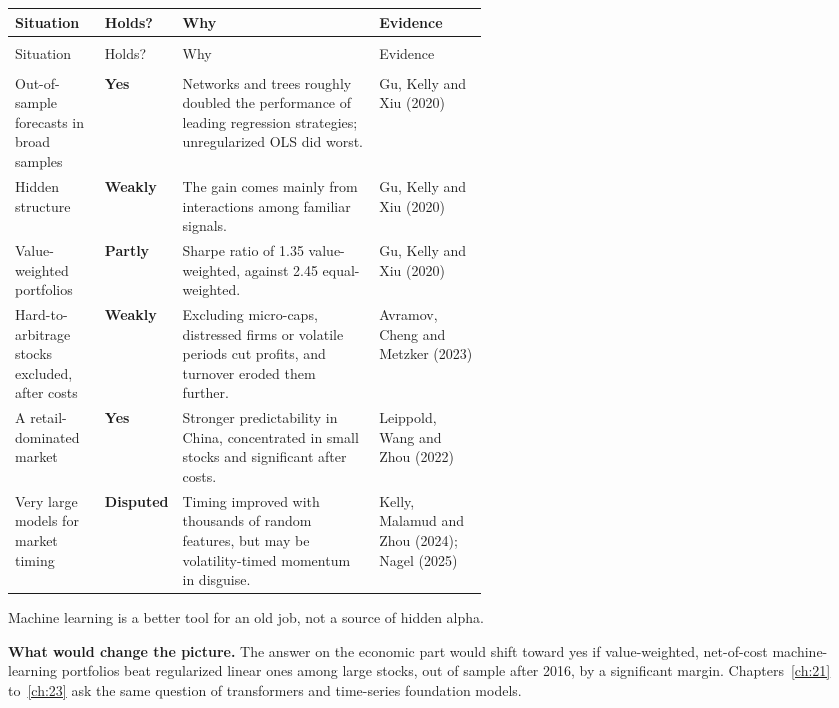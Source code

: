 {\small
\begin{longtable}{@{}>{\raggedright\arraybackslash}p{0.19\linewidth}>{\raggedright\arraybackslash}p{0.13\linewidth}>{\raggedright\arraybackslash}p{}>{\raggedright\arraybackslash}p{0.23\linewidth}@{}}
\toprule
Situation & Holds? & Why & Evidence \\
\midrule
\endfirsthead
\multicolumn{4}{@{}l}{\emph{(continued)}} \\
\toprule
Situation & Holds? & Why & Evidence \\
\midrule
\endhead
\midrule
\multicolumn{4}{r@{}}{\emph{(continued on the next page)}} \\
\endfoot
\bottomrule
\endlastfoot
Out-of-sample forecasts in broad samples & \textbf{Yes} & Networks and trees roughly doubled the performance of leading regression strategies; unregularized OLS did worst. & Gu, Kelly and Xiu (2020) \\*
\addlinespace[3pt]
Hidden structure & \textbf{Weakly} & The gain comes mainly from interactions among familiar signals. & Gu, Kelly and Xiu (2020) \\
\addlinespace[3pt]
Value-weighted portfolios & \textbf{Partly} & Sharpe ratio of 1.35 value-weighted, against 2.45 equal-weighted. & Gu, Kelly and Xiu (2020) \\
\addlinespace[3pt]
Hard-to-arbitrage stocks excluded, after costs & \textbf{Weakly} & Excluding micro-caps, distressed firms or volatile periods cut profits, and turnover eroded them further. & Avramov, Cheng and Metzker (2023) \\
\addlinespace[3pt]
A retail-dominated market & \textbf{Yes} & Stronger predictability in China, concentrated in small stocks and significant after costs. & Leippold, Wang and Zhou (2022) \\*
\addlinespace[3pt]
Very large models for market timing & \textbf{Disputed} & Timing improved with thousands of random features, but may be volatility-timed momentum in disguise. & Kelly, Malamud and Zhou (2024); Nagel (2025) \\
\end{longtable}
\addtocounter{table}{-1}%
}

Machine learning is a better tool for an old job, not a source of hidden alpha.

\textbf{What would change the picture.} The answer on the economic part would shift toward yes if value-weighted, net-of-cost machine-learning portfolios beat regularized linear ones among large stocks, out of sample after 2016, by a significant margin. Chapters~\ref{ch:21} to~\ref{ch:23} ask the same question of transformers and time-series foundation models.

